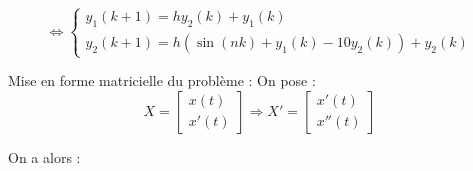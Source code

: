 \documentclass[10pt,fleqn]{article} %
\begin{document}
\begin{multicols}{2}
\begin{corrige}
$$\Leftrightarrow
\left\{
\begin{array}{l}
y_1(k+1) = hy_2(k)+y_1(k) \\
y_2(k+1)  = h \left(  \sin \left(nk\right)+ y_1(k)-10y_2(k) \right)+y_2(k)
\end{array}
\right.
$$

\end{corrige}

\begin{corrige}
Mise en forme matricielle du problème : 
On pose : 
$$
X = \left[
\begin{array}{c}
x(t) \\
x'(t)
\end{array}
\right]
\Rightarrow
X' = \left[
\begin{array}{c}
x'(t) \\
x''(t)
\end{array}
\right]
$$

On a alors : 

\end{corrige}

\end{multicols}
\end{document}
